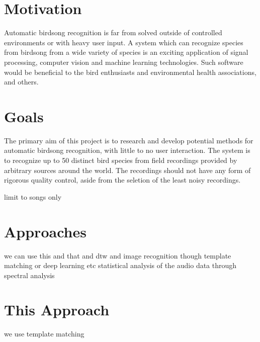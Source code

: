 \section{Motivation}
Automatic birdsong recognition is far from solved outside of controlled
environments or with heavy user input.
A system which can recognize species from birdsong from a wide variety of
species is an exciting application of signal processing, computer vision and
machine learning technologies.
Such software would be beneficial to the bird enthusiasts and environmental
health associations, and others.

\section{Goals}
The primary aim of this project is to research and develop potential methods
for automatic birdsong recognition, with little to no user interaction.
The system is to recognize up to 50 distinct bird species from field recordings
provided by arbitrary sources around the world.
The recordings should not have any form of rigorous quality control, aside from
the seletion of the least noisy recordings.

limit to songs only

\section{Approaches}
we can use this and that and dtw and image recognition though template matching
or deep learning etc statistical analysis of the audio data through spectral
analysis

\section{This Approach}
we use template matching
